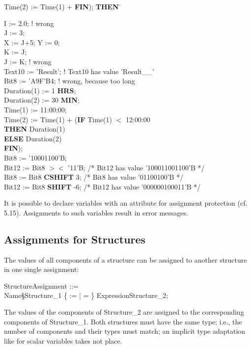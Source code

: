 \begin{tabbing}
Time(2) := Time(1) + \= {\bf FIN}); \= {\bf THEN} \= \kill

I := 2.0; \> \> \> ! wrong \\
J := 3;   \> \> \> \\
X := J+5; Y := 0; \> \> \> \\
K := J;   \> \> \> \\
J := K;   \> \> \> ! wrong\\
Text10 := 'Result'; \> \> \> ! Text10 has value 'Result\_\_' \\
Bit8 := 'A9F'B4;    \> \> \>! wrong, because too long \\
Duration(1) := 1 {\bf HRS}; \> \> \>\\
Duration(2) := 30 {\bf MIN}; \> \> \> \\
Time(1) := 11:00:00; \> \> \>\\
Time(2) := Time(1) + \> ({\bf IF} \> Time(1) $<$ 12:00:00 \> \\
       \>          \> {\bf THEN} Duration(1) \> \\
       \>          \> {\bf ELSE} Duration(2) \> \\
       \> {\bf FIN}); \> \> \\
Bit8 := '10001100'B; \> \> \> \\
Bit12 := Bit8 $><$ '11'B; \> \> \> /* Bit12 has value '100011001100'B */ \\
Bit8 := Bit8 {\bf CSHIFT} 3; \> \> \> /* Bit8 has value '01100100'B */ \\
Bit12 := Bit8 {\bf SHIFT} -6; \> \> \> /* Bit12 has value '000000100011'B */ \\
\end{tabbing}

It is possible to declare variables with an attribute for assignment
protection (cf. 5.15). Assignments to such variables result in error
messages.

\subsection{Assignments for Structures}   %

The values of all components of a structure can be assigned to another
structure in one single assignment:

StructureAssignment ::=\\
\x Name\S Structure\_1 \{ := $\mid$ = \} ExpressionStructure\_2;

The values of the components of Structure\_2 are assigned to the
corresponding components of Structure\_1. Both structures must have the same
type; i.e., the number of components and their types must match; an
implicit type adaptation like for scalar variables takes not place.

